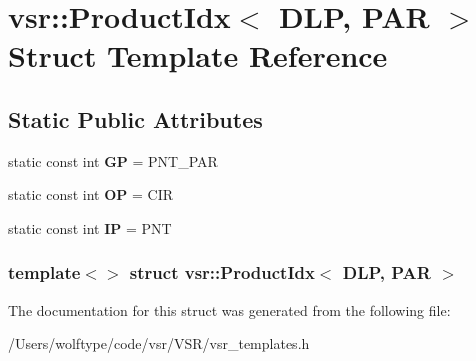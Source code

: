 \hypertarget{structvsr_1_1_product_idx_3_01_d_l_p_00_01_p_a_r_01_4}{\section{vsr\-:\-:Product\-Idx$<$ D\-L\-P, P\-A\-R $>$ Struct Template Reference}
\label{structvsr_1_1_product_idx_3_01_d_l_p_00_01_p_a_r_01_4}
}
\subsection*{Static Public Attributes}
\begin{DoxyCompactItemize}
\item 
\hypertarget{structvsr_1_1_product_idx_3_01_d_l_p_00_01_p_a_r_01_4_a883295cc4fecceb2afae9a40c7a43132}{static const int {\bfseries G\-P} = P\-N\-T\-\_\-\-P\-A\-R}\label{structvsr_1_1_product_idx_3_01_d_l_p_00_01_p_a_r_01_4_a883295cc4fecceb2afae9a40c7a43132}

\item 
\hypertarget{structvsr_1_1_product_idx_3_01_d_l_p_00_01_p_a_r_01_4_a3e7748001b1d4d8d8b7200f108e0bc32}{static const int {\bfseries O\-P} = C\-I\-R}\label{structvsr_1_1_product_idx_3_01_d_l_p_00_01_p_a_r_01_4_a3e7748001b1d4d8d8b7200f108e0bc32}

\item 
\hypertarget{structvsr_1_1_product_idx_3_01_d_l_p_00_01_p_a_r_01_4_a065e296e83b836c9b8b6e4129ec41f5c}{static const int {\bfseries I\-P} = P\-N\-T}\label{structvsr_1_1_product_idx_3_01_d_l_p_00_01_p_a_r_01_4_a065e296e83b836c9b8b6e4129ec41f5c}

\end{DoxyCompactItemize}
\subsubsection*{template$<$$>$ struct vsr\-::\-Product\-Idx$<$ D\-L\-P, P\-A\-R $>$}



The documentation for this struct was generated from the following file\-:\begin{DoxyCompactItemize}
\item 
/\-Users/wolftype/code/vsr/\-V\-S\-R/vsr\-\_\-templates.\-h\end{DoxyCompactItemize}
